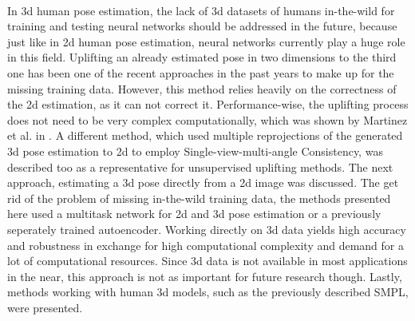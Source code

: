 \\ In 3d human pose estimation, the lack of 3d datasets of humans in-the-wild for training and testing neural networks should be addressed in the future, because just like in 2d human pose estimation, neural networks currently play a huge role in this field. Uplifting an already estimated pose in two dimensions to the third one has been one of the recent approaches in the past years to make up for the missing training data. However, this method relies heavily on the correctness of the 2d estimation, as it can not correct it. Performance-wise, the uplifting process does not need to be very complex computationally, which was shown by Martinez et al. in \cite{Martinez_2017_ICCV}. A different method, which used multiple reprojections of the generated 3d pose estimation to 2d to employ Single-view-multi-angle Consistency, was described too as a representative for unsupervised uplifting methods. The next approach, estimating a 3d pose directly from a 2d image was discussed. The get rid of the problem of missing in-the-wild training data, the methods presented here used a multitask network for 2d and 3d pose estimation or a previously seperately trained autoencoder. Working directly on 3d data yields high accuracy and robustness in exchange for high computational complexity and demand for a lot of computational resources. Since 3d data is not available in most applications in the near, this approach is not as important for future research though. Lastly, methods working with human 3d models, such as the previously described SMPL, were presented. 